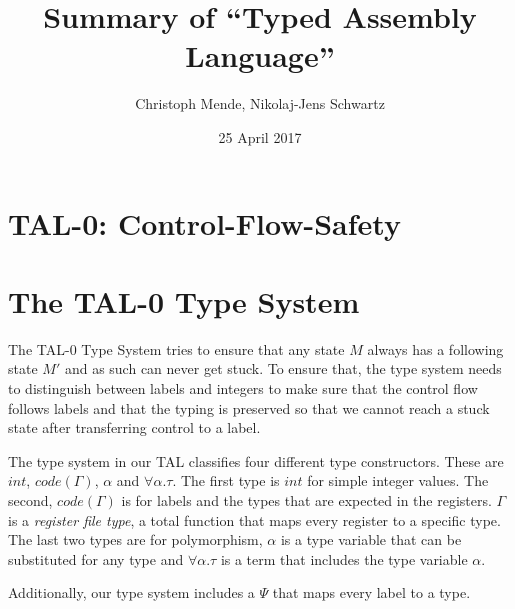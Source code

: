 \documentclass[acmlarge]{acmart}
\begin{document}

\title{Summary of ``Typed Assembly Language''\cite{Pierce:2004:ATT:1076265}}
\author{Christoph Mende, Nikolaj-Jens Schwartz}
\date{25 April 2017}
\maketitle


\section{TAL-0: Control-Flow-Safety}

\section{The TAL-0 Type System}

The TAL-0 Type System tries to ensure that any state $M$ always has a following state $M'$ and as such can never get stuck. To ensure that, the type system needs to distinguish between labels and integers to make sure that the control flow follows labels and that the typing is preserved so that we cannot reach a stuck state after transferring control to a label.

The type system in our TAL classifies four different type constructors. These are $int$, $code(\Gamma)$, $\alpha$ and $\forall \alpha. \tau$. The first type is $int$ for simple integer values. The second, $code(\Gamma)$ is for labels and the types that are expected in the registers. $\Gamma$ is a \emph{register file type}, a total function that maps every register to a specific type. The last two types are for polymorphism, $\alpha$ is a type variable that can be substituted for any type and $\forall \alpha. \tau$ is a term that includes the type variable $\alpha$.

Additionally, our type system includes a $\Psi$ that maps every label to a type.



\end{document}
